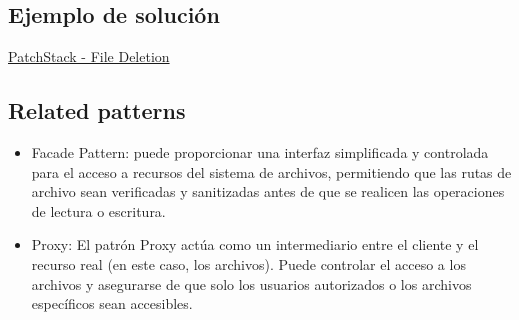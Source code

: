 \subsection{Ejemplo de solución}
\href{https://patchstack.com/academy/wordpress/securing-code/arbitrary-file-deletion/}{PatchStack - File Deletion}
\subsection{Related patterns}
\begin{itemize}
    \item Facade Pattern: puede proporcionar una interfaz simplificada y controlada para el acceso
    a recursos del sistema de archivos, permitiendo que las rutas de archivo sean verificadas
    y sanitizadas antes de que se realicen las operaciones de lectura o escritura.
    \item Proxy: El patrón Proxy actúa como un intermediario entre el cliente y el recurso real (en este caso, los archivos). Puede controlar el acceso a los archivos y asegurarse de que solo los usuarios autorizados o los archivos específicos sean accesibles.
\end{itemize}

